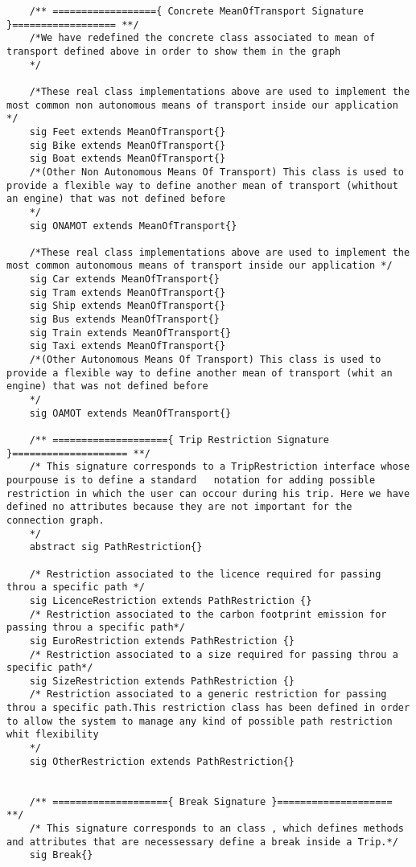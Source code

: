 \documentclass[a4paper,leqno]{book}
\begin{document}
\begin{lstlisting}
	/** =================={ Concrete MeanOfTransport Signature }================== **/
	/*We have redefined the concrete class associated to mean of transport defined above in order to show them in the graph
	*/
	
	/*These real class implementations above are used to implement the most common non autonomous means of transport inside our application */
	sig Feet extends MeanOfTransport{}
	sig Bike extends MeanOfTransport{}
	sig Boat extends MeanOfTransport{}
	/*(Other Non Autonomous Means Of Transport) This class is used to provide a flexible way to define another mean of transport (whithout an engine) that was not defined before
	*/
	sig ONAMOT extends MeanOfTransport{}
	
	/*These real class implementations above are used to implement the most common autonomous means of transport inside our application */
	sig Car extends MeanOfTransport{}
	sig Tram extends MeanOfTransport{}
	sig Ship extends MeanOfTransport{}
	sig Bus extends MeanOfTransport{}
	sig Train extends MeanOfTransport{}
	sig Taxi extends MeanOfTransport{}
	/*(Other Autonomous Means Of Transport) This class is used to provide a flexible way to define another mean of transport (whit an engine) that was not defined before
	*/
	sig OAMOT extends MeanOfTransport{}
	
	/** ===================={ Trip Restriction Signature }==================== **/
	/* This signature corresponds to a TripRestriction interface whose pourpouse is to define a standard   notation for adding possible restriction in which the user can occour during his trip. Here we have defined no attributes because they are not important for the connection graph.
	*/
	abstract sig PathRestriction{}
	
	/* Restriction associated to the licence required for passing throu a specific path */
	sig LicenceRestriction extends PathRestriction {}
	/* Restriction associated to the carbon footprint emission for passing throu a specific path*/
	sig EuroRestriction extends PathRestriction {}
	/* Restriction associated to a size required for passing throu a specific path*/
	sig SizeRestriction extends PathRestriction {}
	/* Restriction associated to a generic restriction for passing throu a specific path.This restriction class has been defined in order to allow the system to manage any kind of possible path restriction whit flexibility
	*/
	sig OtherRestriction extends PathRestriction{}
	
	
	/** ===================={ Break Signature }==================== **/
	/* This signature corresponds to an class , which defines methods and attributes that are necessessary define a break inside a Trip.*/
	sig Break{}
	

\end{lstlisting}
\end{document}
